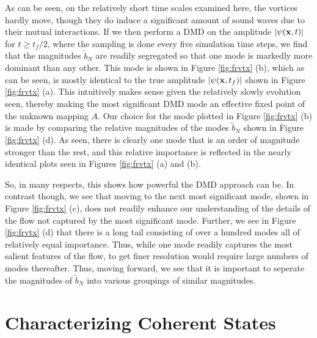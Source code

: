 \documentclass[a4paper,11pt]{article}
\begin{document}
As can be seen, on the relatively short time scales examined here, the vortices hardly move, though they do induce a significant amount of sound waves due to their mutual interactions.  If we then perform a DMD on the amplitude $\left|\psi({\bf x},t)\right|$ for $t\geq t_{f}/2$, where the sampling is done every five simulation time steps, we find that the magnitudes $\tilde{b}_{N}$ are readily segregated so that one mode is markedly more dominant than any other.  This mode is shown in Figure \ref{fig:frvtx} (b), which as can be seen, is mostly identical to the true amplitude $\left|\psi({\bf x},t_{f})\right|$ shown in Figure \ref{fig:frvtx} (a).  This intuitively makes sense given the relatively slowly evolution seen, thereby making the most significant DMD mode an effective fixed point of the unknown mapping $A$.  Our choice for the mode plotted in Figure \ref{fig:frvtx} (b) is made by comparing the relative magnitudes of the modes $\tilde{b}_{N}$ shown in Figure \ref{fig:frvtx} (d).  As seen, there is clearly one mode that is an order of magnitude stronger than the rest, and this relative importance is reflected in the nearly identical plots seen in Figures \ref{fig:frvtx} (a) and (b).

So, in many respects, this shows how powerful the DMD approach can be.  In contrast though, we see that moving to the next most significant mode, shown in Figure \ref{fig:frvtx} (c), does not readily enhance our understanding of the details of the flow not captured by the most significant mode.  Further, we see in Figure \ref{fig:frvtx} (d) that there is a long tail consisting of over a hundred modes all of relatively equal importance.  Thus, while one mode readily captures the most salient features of the flow, to get finer resolution would require large numbers of modes thereafter.  Thus, moving forward, we see that it is important to seperate the magnitudes of $\tilde{b}_{N}$ into various groupings of similar magnitudes.  
 
\section*{Characterizing Coherent States}
\end{document}
